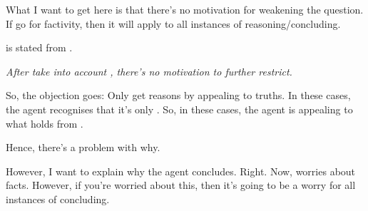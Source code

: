 \begin{note}
  {
    \color{red}
    What I want to get here is that there's no motivation for weakening the question.
    If go for factivity, then it will apply to all instances of reasoning/concluding.

    \qWhyV{} is stated from \agpe{}.

    \emph{After take into account \agpe{}, there's no motivation to further restrict.}
  }
  \color{blue}
  So, the objection goes:
  Only get reasons by appealing to truths.
  In these cases, the agent recognises that it's only .
  So, in these cases, the agent is appealing to what holds from .

  Hence, there's a problem with why.

  However, I want to explain why the agent concludes.
  Right.
  Now, worries about facts.
  However, if you're worried about this, then it's going to be a worry for all instances of concluding.
  
\end{note}

